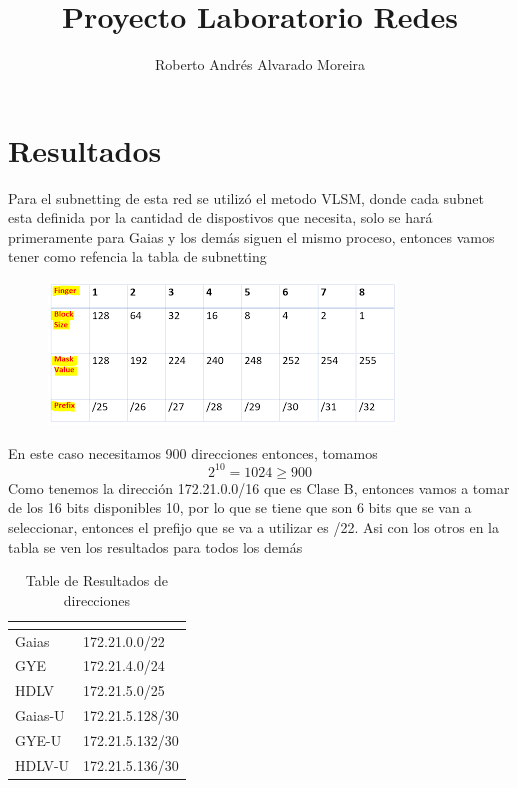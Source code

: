 \documentclass{article}
\title{Proyecto Laboratorio Redes}
\author{Roberto Andrés Alvarado Moreira}
\begin{document}
\maketitle
\section{Resultados}%

Para el subnetting de esta red se utilizó el metodo VLSM,
donde cada subnet esta definida por la cantidad de
dispostivos que necesita, solo se hará primeramente para
Gaias y los demás siguen el mismo proceso, 
entonces vamos  tener como refencia la tabla de subnetting  

\begin{figure}[h]
\begin{center}
  \includegraphics[scale=0.8]{image1.png}
\end{center}
\end{figure}
En este caso necesitamos 900 direcciones entonces, tomamos 
$$2^{10} = 1024 \geq 900 $$
Como tenemos la dirección 172.21.0.0/16 que es Clase B, entonces vamos a tomar
de los 16 bits disponibles 10, por lo que se tiene que son 6 bits que se van a
seleccionar, entonces el prefijo que se va a utilizar es /22. Asi con los otros
en la tabla se ven los resultados para todos los demás


\newpage
\begin{table}[h]
  \caption{Table de Resultados de direcciones}
  \label{tab:}
  \begin{center}
    \begin{tabular}[c]{l|l}
      \hline
      \multicolumn{1}{c|}{\textbf{}} & 
      \multicolumn{1}{c}{\textbf{}} \\
      \hline
       Gaias   & 172.21.0.0/22 \\
       GYE     & 172.21.4.0/24 \\
       HDLV    & 172.21.5.0/25 \\
       Gaias-U & 172.21.5.128/30 \\
       GYE-U   & 172.21.5.132/30 \\
       HDLV-U  & 172.21.5.136/30 \\
      \hline
    \end{tabular}
  \end{center}
\end{table}
 
\end{document}
